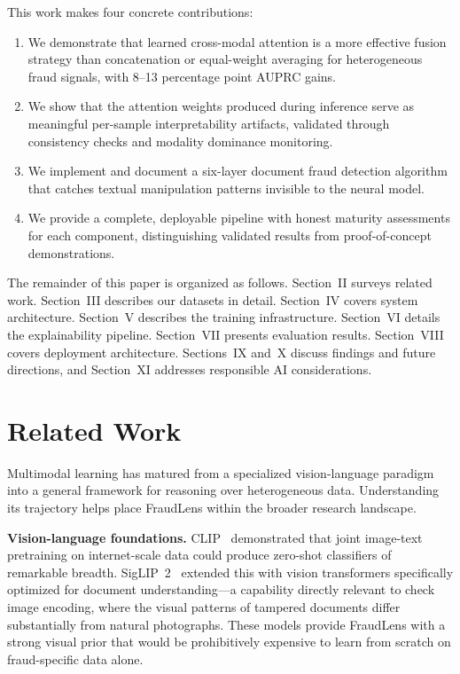 \documentclass[10pt,conference,letterpaper]{IEEEtran}
\begin{document}
This work makes four concrete contributions:
\begin{enumerate}
  \item We demonstrate that learned cross-modal attention is a more effective fusion
  strategy than concatenation or equal-weight averaging for heterogeneous fraud signals,
  with 8--13 percentage point AUPRC gains.
  \item We show that the attention weights produced during inference serve as meaningful
  per-sample interpretability artifacts, validated through consistency checks and
  modality dominance monitoring.
  \item We implement and document a six-layer document fraud detection algorithm that
  catches textual manipulation patterns invisible to the neural model.
  \item We provide a complete, deployable pipeline with honest maturity assessments for
  each component, distinguishing validated results from proof-of-concept demonstrations.
\end{enumerate}

The remainder of this paper is organized as follows. Section~II surveys related work.
Section~III describes our datasets in detail. Section~IV covers system architecture.
Section~V describes the training infrastructure. Section~VI details the explainability
pipeline. Section~VII presents evaluation results. Section~VIII covers deployment
architecture. Sections~IX and~X discuss findings and future directions, and Section~XI
addresses responsible AI considerations.

\section{Related Work}

Multimodal learning has matured from a specialized vision-language paradigm into a
general framework for reasoning over heterogeneous data. Understanding its trajectory
helps place FraudLens within the broader research landscape.

\textbf{Vision-language foundations.} CLIP~\cite{CLIP} demonstrated that joint image-text
pretraining on internet-scale data could produce zero-shot classifiers of remarkable
breadth. SigLIP~2~\cite{SigLIP2} extended this with vision transformers specifically
optimized for document understanding---a capability directly relevant to check image
encoding, where the visual patterns of tampered documents differ substantially from
natural photographs. These models provide FraudLens with a strong visual prior that
would be prohibitively expensive to learn from scratch on fraud-specific data alone.
\end{document}
